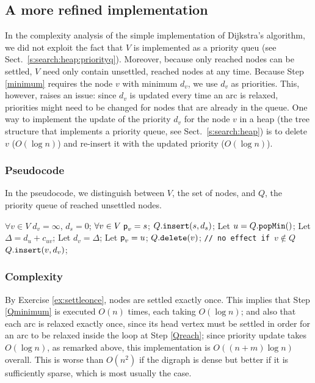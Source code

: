 \documentclass[a4paper]{book}
\theoremstyle{changebreak}                %
\begin{document}
\subsection{A more refined implementation}
In the complexity analysis of the simple implementation of Dijkstra's
algorithm, we did not exploit the fact that
$V$ is implemented as a priority queu (see
Sect.~\ref{s:search:heap:priorityq}). Moreover, because only reached
nodes can be settled, $V$ need only
contain unsettled, reached nodes at any
time. Because Step \ref{minimum} requires the node $v$ with minimum
$d_v$, we use $d_v$ as priorities. This, however, raises an issue:
since $d_v$ is updated every time an arc is
relaxed, priorities might need to be changed for
nodes that are already in the queue. One way to implement the update
of the priority $d_v$ for the node $v$ in a
heap (the tree structure that implements a priority queue,
see Sect.~\ref{s:search:heap}) is to delete $v$ ($O(\log n)$) and
re-insert it with the updated priority ($O(\log n)$).

\subsubsection{Pseudocode}
In the pseudocode, we distinguish between $V$, the set of nodes, and
$Q$, the priority queue of reached unsettled
nodes.
\begin{algorithmic}[1]
\STATE $\forall v\in V\; d_v=\infty$, $d_s=0$;
\STATE $\forall v\in V\; \mbox{\sf p}_v=s$;
\STATE $Q.\mbox{\tt insert}(s,d_s)$;
  \STATE Let $u=Q.\mbox{\tt popMin}()$; \label{Qminimum}
   \label{Qreach}
    \STATE Let $\Delta=d_u+c_{uv}$; 
     \label{Qrelax}
      \STATE Let $d_v = \Delta$;
      \STATE Let $\mbox{\sf p}_v = u$;
      \STATE $Q.\mbox{\tt delete}(v)$; {\tt // no effect if $v\not\in
        Q$} \label{Qupdpriority1} 
      \STATE $Q.\mbox{\tt insert}(v,d_v)$; \label{Qupdpriority2}
    \ENDIF
  \ENDFOR
\ENDWHILE
\end{algorithmic}

\subsubsection{Complexity}
By Exercise \ref{ex:settleonce}, nodes are settled exactly once. This
implies that Step \ref{Qminimum} is executed $O(n)$ times, each taking
$O(\log n)$; and also that each arc is relaxed
exactly once, since its head vertex must be settled in order for an
arc to be relaxed inside the loop at Step \ref{Qreach}; since priority
update takes $O(\log n)$, as remarked above, this implementation is
$O((n+m)\log n)$ overall. This is worse than $O(n^2)$ if the digraph
is dense but better if it is sufficiently
sparse, which is most usually the case.
\end{document}
